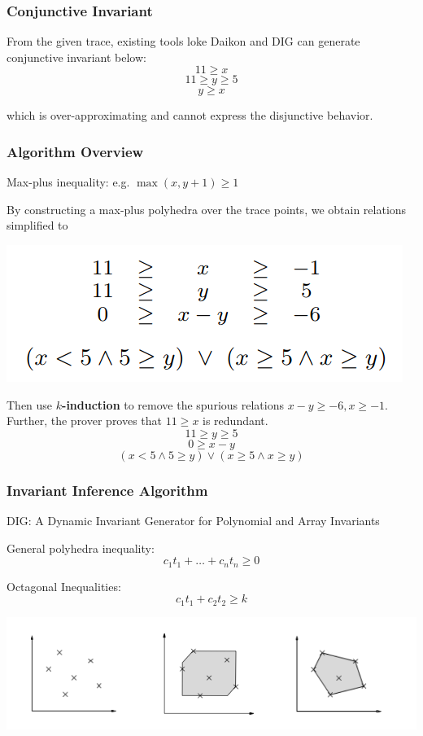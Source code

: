 \documentclass[11pt]{beamer}
\begin{document}
\begin{frame}\frametitle{Conjunctive Invariant}
From the given trace, existing tools loke Daikon and DIG can generate conjunctive invariant below:
\[11\ge x\]\[11 \ge y \ge 5\]\[y \ge x\]

which is over-approximating and cannot express the disjunctive behavior.
\end{frame}
\begin{frame}\frametitle{Algorithm Overview}
Max-plus inequality: e.g. $\max(x, y+1) \ge 1$

By constructing a max-plus polyhedra over the trace points, we obtain relations simplified to 
\begin{center}
\includegraphics[scale=0.4]{2.png}
\end{center}
Then use $k$\textbf{-induction} to remove the spurious relations $x - y \ge -6, x \ge -1$. Further, the prover proves that $11 \ge x$ is redundant.
\[11 \ge y  \ge 5\]
\[0 \ge x - y\]
\[(x < 5 \wedge 5 \ge y)\vee(x \ge 5 \wedge x \ge y)\]
\end{frame}

\begin{frame}\frametitle{Invariant Inference Algorithm}
DIG: A Dynamic Invariant Generator for Polynomial and Array Invariants

General polyhedra inequality:
\[c_1t_1+\ldots + c_nt_n \ge 0\]

Octagonal Inequalities:
\[c_1t_1 + c_2t_2 \ge k\]



\begin{center}
\includegraphics[scale=0.3]{10.png}
\end{center}
\end{frame}
\end{document}
